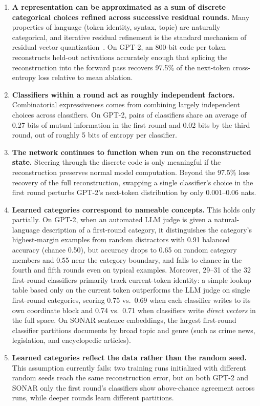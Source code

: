 \documentclass[11pt]{article}
\begin{document}
\begin{enumerate}
\item \textbf{A representation can be approximated as a sum of discrete
categorical choices refined across successive residual rounds.} Many
properties of language (token identity, syntax, topic) are naturally
categorical, and iterative residual refinement is the standard mechanism
of residual vector quantization~\cite{juang1982,barnes1996}. On GPT-2, an 800-bit
code per token reconstructs held-out activations accurately enough that
splicing the reconstruction into the forward pass recovers 97.5\% of the
next-token cross-entropy loss relative to mean ablation.
\item \textbf{Classifiers within a round act as roughly independent
factors.} Combinatorial expressiveness comes from combining largely
independent choices across classifiers. On GPT-2, pairs of classifiers
share an average of 0.27 bits of mutual information in the first round and
0.02 bits by the third round, out of roughly 5 bits of entropy per
classifier.
\item \textbf{The network continues to function when run on the
reconstructed state.} Steering through the discrete code is only
meaningful if the reconstruction preserves normal model computation.
Beyond the 97.5\% loss recovery of the full reconstruction, swapping a
single classifier's choice in the first round perturbs GPT-2's next-token
distribution by only 0.001--0.06 nats.
\item \textbf{Learned categories correspond to nameable concepts.} This
holds only partially. On GPT-2, when an automated LLM judge is given a
natural-language description of a first-round category, it distinguishes
the category's highest-margin examples from random distractors with 0.91
balanced accuracy (chance 0.50), but accuracy drops to 0.65 on random
category members and 0.55 near the category boundary, and falls to chance
in the fourth and fifth rounds even on typical examples. Moreover, 29--31
of the 32 first-round classifiers primarily track current-token identity:
a simple lookup table based only on the current token outperforms the LLM
judge on single first-round categories, scoring 0.75 vs.\ 0.69 when each
classifier writes to its own coordinate block and 0.74 vs.\ 0.71 when
classifiers write \emph{direct vectors} in the full space. On SONAR
sentence embeddings, the largest first-round classifier partitions
documents by broad topic and genre (such as crime news, legislation, and
encyclopedic articles).
\item \textbf{Learned categories reflect the data rather than the random
seed.} This assumption currently fails: two training runs initialized with
different random seeds reach the same reconstruction error, but on both
GPT-2 and SONAR only the first round's classifiers show above-chance
agreement across runs, while deeper rounds learn different partitions.
\end{enumerate}
\end{document}

